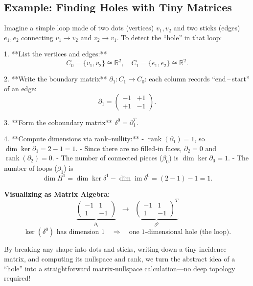\subsection{Example: Finding Holes with Tiny Matrices}  
Imagine a simple loop made of two dots (vertices) \(v_1,v_2\) and two sticks (edges) \(e_1,e_2\) connecting \(v_1\!\to v_2\) and \(v_2\!\to v_1\).  To detect the “hole” in that loop:

\medskip

1. **List the vertices and edges:**  
   \[
   C_0 = \{v_1,v_2\}\cong\mathbb R^2,
   \quad
   C_1 = \{e_1,e_2\}\cong\mathbb R^2.
   \]

2. **Write the boundary matrix** \(\partial_1: C_1\to C_0\):  
   each column records “end – start” of an edge:
   \[
   \partial_1
   = \begin{pmatrix}
     -1 & +1 \\  %
     +1 & -1
   \end{pmatrix}.
   \]

3. **Form the coboundary matrix** \(\delta^0 = \partial_1^T\).  

4. **Compute dimensions via rank–nullity:**  
   - \(\operatorname{rank}(\partial_1)=1\), so \(\dim\ker\partial_1=2-1=1\).  
   - Since there are no filled‐in faces, \(\partial_2=0\) and \(\operatorname{rank}(\partial_2)=0\).  
   - The number of connected pieces (\(\beta_0\)) is \(\dim\ker\partial_0 = 1\).  
   - The number of loops (\(\beta_1\)) is
     \[
       \dim H^1
       = \dim\ker\delta^1 - \dim\operatorname{im}\delta^0
       = (2 - 1) - 1 = 1.
     \]

\medskip

\noindent\textbf{Visualizing as Matrix Algebra:}
\[
\underbrace{
\begin{pmatrix}-1 & 1\\1 & -1\end{pmatrix}
}_{\partial_1}
\;\;
\longrightarrow\;\;
\underbrace{
\begin{pmatrix}-1 & 1\\1 & -1\end{pmatrix}^T
}_{\delta^0}
\]
\[
\ker(\delta^0)\text{ has dimension }1
\quad\Longrightarrow\quad
\text{one 1-dimensional hole (the loop).}
\]

\medskip

\noindent By breaking any shape into dots and sticks, writing down a tiny incidence matrix, and computing its nullspace and rank, we turn the abstract idea of a “hole” into a straightforward matrix‐nullspace calculation—no deep topology required!  

























